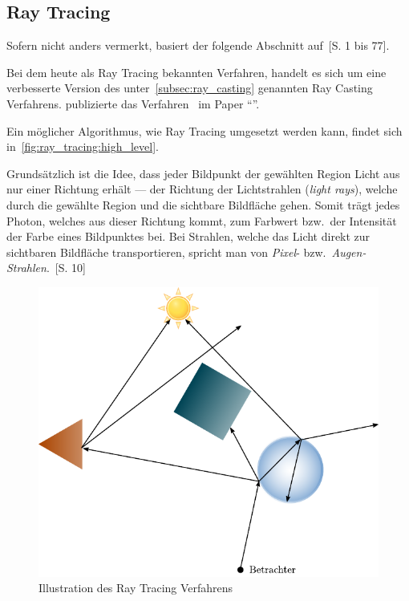 \subsection{Ray Tracing}
\label{subsec:ray_tracing}

Sofern nicht anders vermerkt, basiert der folgende Abschnitt
auf~\cite{glassner_introduction_1989}[S. 1 bis 77].

Bei dem heute als Ray Tracing bekannten Verfahren, handelt es sich um
eine verbesserte Version des unter~\ref{subsec:ray_casting} genannten
Ray Casting Verfahrens. \citeauthor{whitted_improved_1980} publizierte
das Verfahren~\citeyear{whitted_improved_1980} im Paper
``''.

Ein möglicher Algorithmus, wie Ray Tracing umgesetzt werden kann,
findet sich in~\ref{fig:ray_tracing:high_level}.

Grundsätzlich ist die Idee, dass jeder Bildpunkt der gewählten Region
Licht aus nur einer Richtung erhält --- der Richtung der Lichtstrahlen
(\textit{light rays}), welche durch die gewählte Region und die
sichtbare Bildfläche gehen. Somit trägt jedes Photon, welches aus dieser
Richtung kommt, zum Farbwert bzw.\ der Intensität der Farbe eines
Bildpunktes bei. Bei Strahlen, welche das Licht direkt zur sichtbaren
Bildfläche transportieren, spricht man von \textit{Pixel}- bzw.\
\textit{Augen-Strahlen}.~\cite{glassner_introduction_1989}[S. 10]

\begin{figure}[H]\label{fig:ray_tracing_scene}
    \centering
    \includegraphics{img/ray_tracing_scene.pdf}
    \caption{Illustration des Ray Tracing Verfahrens\protect\footnotemark}
\end{figure}

